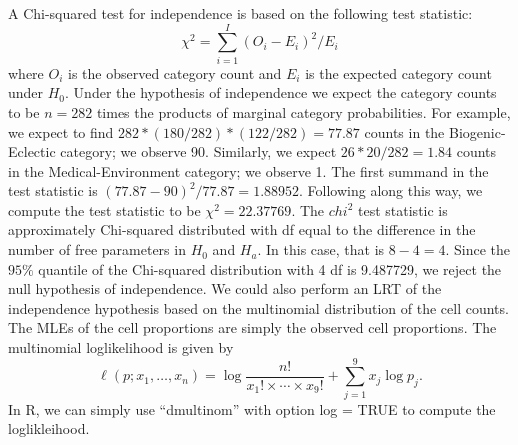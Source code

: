 \documentclass[]{book}
\begin{document}
A Chi-squared test for independence is based on the following test
statistic: \[\chi^2 = \sum_{i=1}^I (O_i - E_i)^2 / E_i\] where \(O_i\)
is the observed category count and \(E_i\) is the expected category
count under \(H_0\). Under the hypothesis of independence we expect the
category counts to be \(n = 282\) times the products of marginal
category probabilities. For example, we expect to find
\(282 *(180/282)*(122/282) = 77.87\) counts in the Biogenic-Eclectic
category; we observe 90. Similarly, we expect \(26*20/282 = 1.84\)
counts in the Medical-Environment category; we observe 1. The first
summand in the test statistic is \((77.87 - 90)^2 / 77.87 = 1.88952\).
Following along this way, we compute the test statistic to be
\(\chi^2 = 22.37769\). The \(chi^2\) test statistic is approximately
Chi-squared distributed with df equal to the difference in the number of
free parameters in \(H_0\) and \(H_a\). In this case, that is
\(8 - 4 = 4\). Since the \(95\%\) quantile of the Chi-squared
distribution with 4 df is 9.487729, we reject the null hypothesis of
independence. We could also perform an LRT of the independence
hypothesis based on the multinomial distribution of the cell counts. The
MLEs of the cell proportions are simply the observed cell proportions.
The multinomial loglikelihood is given by
\[\ell(p;x_1, \ldots, x_n) = \log \frac{n!}{x_1!\times \cdots \times x_9!} + \sum_{j=1}^9 x_j\log p_j.\]
In R, we can simply use ``dmultinom'' with option log = TRUE to compute
the loglikleihood.
\end{document}
